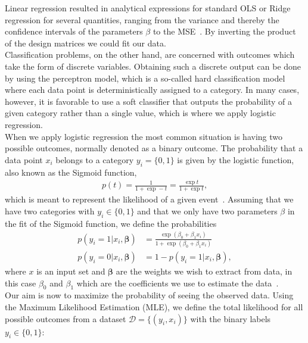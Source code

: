 \documentclass[english,notitlepage,reprint,nofootinbib]{revtex4-2}  %
\begin{document}
Linear regression resulted in analytical expressions for standard OLS or Ridge regression for several quantities, ranging from the variance and thereby the confidence intervals of the parameters $\beta$ to the MSE~\cite{lecture_notes}. By inverting the product of the design matrices we could fit our data. 
\vspace{3mm}
\\
Classification problems, on the other hand, are concerned with outcomes which take the form of discrete variables. 
Obtaining such a discrete output can be done by using the perceptron model, which is a so-called hard classification model where each data point is deterministically assigned to a category. In many cases, however, it is favorable to use a soft classifier that outputs the probability of a given category rather than a single value, which is where we apply logistic regression. 
\vspace{3mm}
\\
When we apply logistic regression the most common situation is having two possible outcomes, normally denoted as a binary outcome. 
The probability that a data point $x_i$ belongs to a category $y_i = \{0,1\}$ is given by the logistic function, also known as the Sigmoid function, 
\begin{align}\label{eq: logistic_function} %
    p(t) = \frac{1}{1+\exp -t} = \frac{\exp t}{1+\exp t}, 
\end{align}
which is meant to represent the likelihood of a given event~\cite{friedman}. 
Assuming that we have two categories with $y_i\in\{0,1\}$ and that we only have two parameters $\beta$ in the fit of the Sigmoid function, we define the probabilities 
\begin{align}
    p(y_i=1 | x_i,\boldsymbol{\beta}) &= 
    \frac{\exp(\beta_0 + \beta_1 x_i)}
    {1 + \exp(\beta_0 + \beta_1 x_i)} \\ 
    p(y_i=0 | x_i,\boldsymbol{\beta}) &= 
    1 - p(y_i=1 | x_i,\boldsymbol{\beta}) , 
\end{align}
where $x$ is an input set and $\boldsymbol{\beta}$ are the weights we wish to extract from data, in this case $\beta_0$ and $\beta_1$ which are the coefficients we use to estimate the data~\cite{friedman}. 
\vspace{3mm}
\\ 
Our aim is now to maximize the probability of seeing the observed data. 
Using the Maximum Likelihood Estimation (MLE), we define the total likelihood for all possible outcomes from a dataset $\mathcal{D} = \{(y_i,x_i)\}$ with the binary labels $y_i\in\{0,1\}$: 
\end{document}
